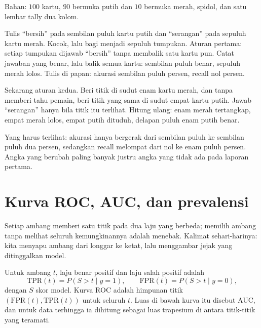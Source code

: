 \begin{tangan}
Bahan: $100$ kartu, $90$ bermuka putih dan $10$ bermuka merah, spidol, dan satu lembar
tally dua kolom.

Tulis ``bersih'' pada sembilan puluh kartu putih dan ``serangan'' pada sepuluh kartu merah.
Kocok, lalu bagi menjadi sepuluh tumpukan. Aturan pertama: setiap tumpukan dijawab
``bersih'' tanpa membalik satu kartu pun. Catat jawaban yang benar, lalu balik semua kartu:
sembilan puluh benar, sepuluh merah lolos. Tulis di papan: akurasi
sembilan puluh persen, recall nol persen.

Sekarang aturan kedua. Beri titik di sudut enam kartu merah, dan tanpa memberi tahu pemain,
beri titik yang sama di sudut empat kartu putih. Jawab ``serangan'' hanya bila titik itu
terlihat. Hitung ulang: enam merah tertangkap, empat merah lolos, empat putih dituduh,
delapan puluh enam putih benar.

Yang harus terlihat: akurasi hanya bergerak dari sembilan puluh ke sembilan puluh dua
persen, sedangkan recall melompat dari nol ke enam puluh persen. Angka yang berubah paling
banyak justru angka yang tidak ada pada laporan pertama.
\end{tangan}

\section{Kurva ROC, AUC, dan prevalensi}

Setiap ambang memberi satu titik pada dua laju yang berbeda; memilih ambang tanpa melihat
seluruh kemungkinannya adalah menebak. Kalimat sehari-harinya: kita menyapu ambang
dari longgar ke ketat, lalu menggambar jejak yang ditinggalkan model.


\begin{definisi}
Untuk ambang $t$, laju benar positif dan laju salah positif adalah
\[
\mathrm{TPR}(t)=P(S>t\mid y=1),\qquad \mathrm{FPR}(t)=P(S>t\mid y=0),
\]
dengan $S$ skor model. Kurva ROC adalah himpunan titik $(\mathrm{FPR}(t),\mathrm{TPR}(t))$
untuk seluruh $t$. Luas di bawah kurva itu disebut AUC, dan untuk data terhingga ia
dihitung sebagai luas trapesium di antara titik-titik yang teramati.
\end{definisi}

